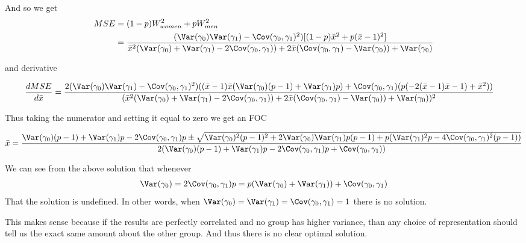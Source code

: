 And so we get
\begin{align*}
	MSE &= (1-p) W_{women}^2 + p W_{men}^2 \\
		&=  \frac{(\Var(\gamma_0) \Var(\gamma_1) - \Cov(\gamma_0, \gamma_1)^2)[(1-p) \bar{x}^2   + p (\bar{x} - 1)^2 ]} { \bar{x}^2 (\Var(\gamma_0) + \Var(\gamma_1) - 2 \Cov(\gamma_0, \gamma_1)) + 2 \bar{x} (\Cov(\gamma_0, \gamma_1) - \Var(\gamma_0)) + \Var(\gamma_0) }
\end{align*} 

and derivative
\begin{scriptsize}
\begin{align*}
	\frac{d MSE}{d\bar{x}} &= 
	\frac{ 2 (\Var(\gamma_0) \Var(\gamma_1) - \Cov(\gamma_0, \gamma_1)^2) ((\bar{x} - 1) \bar{x} (\Var(\gamma_0) (p - 1) + \Var(\gamma_1) p) + \Cov(\gamma_0, \gamma_1) (p (-2 (\bar{x} - 1) \bar{x} - 1) + \bar{x}^2)) }{(\bar{x}^2 (\Var(\gamma_0) + \Var(\gamma_1) - 2 \Cov(\gamma_0, \gamma_1)) + 2 \bar{x} (\Cov(\gamma_0, \gamma_1) - \Var(\gamma_0)) + \Var(\gamma_0))^2}
\end{align*} 
\end{scriptsize}


Thus taking the numerator and setting it equal to zero we get an FOC

\begin{tiny}
\begin{align*}
	\bar{x} = \frac{ \Var(\gamma_0) (p - 1) + \Var(\gamma_1) p - 2 \Cov(\gamma_0, \gamma_1) p \pm \sqrt{ \Var(\gamma_0)^2 (p - 1)^2 + 2 \Var(\gamma_0) \Var(\gamma_1) p (p - 1) + p (\Var(\gamma_1)^2 p - 4 \Cov(\gamma_0, \gamma_1)^2 (p - 1)) } }{ 2 (\Var(\gamma_0) (p - 1) + \Var(\gamma_1) p - 2 \Cov(\gamma_0, \gamma_1) p + \Cov(\gamma_0, \gamma_1)) }
\end{align*} 
\end{tiny}


We can see from the above solution that whenever
\begin{align*}
	\Var(\gamma_0) = 2 \Cov(\gamma_0, \gamma_1) p = p (\Var(\gamma_0) + \Var(\gamma_1)) + \Cov(\gamma_0, \gamma_1)
\end{align*} 
That the solution is undefined. In other words, when $\Var(\gamma_0) = \Var(\gamma_1) = \Cov(\gamma_0, \gamma_1) = 1$ there is no solution. 

This makes sense because if the results are perfectly correlated and no group has higher variance, than any choice of representation should tell us the exact same amount about the other group. And thus there is no clear optimal solution.
